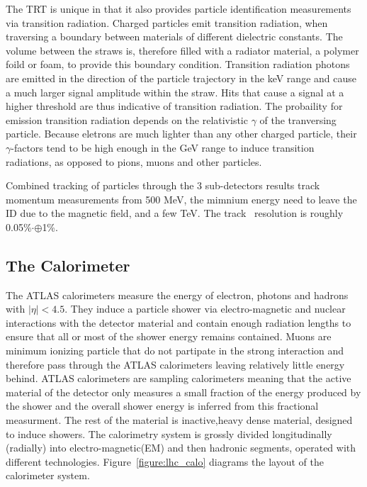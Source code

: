 The TRT is unique in that it also provides particle identification measurements via transition radiation. Charged particles emit transition radiation, when traversing a boundary between materials of different dielectric constants. The volume between the straws is, therefore filled with a radiator material, a polymer foild or foam, to provide this boundary condition. Transition radiation photons are emitted in the direction of the particle trajectory in the keV range and cause a much larger signal amplitude within the straw. Hits that cause a signal at a higher threshold are thus indicative of transition radiation.  The probaility for emission transition radiation depends on the relativistic $\gamma$ of the tranversing particle. Because eletrons are much lighter than any other charged particle, their $\gamma$-factors tend to be high enough in the GeV range to induce transition radiations, as opposed to pions, muons and other particles. 

Combined tracking of particles through the 3 sub-detectors results track momentum measurements from 500 MeV, the mimnium energy need to leave the ID due to the magnetic field, and a few TeV. The track \pt\ resolution is roughly 0.05\%$\cdot$\pt$\oplus$1\%.  

\subsection{The Calorimeter}

The ATLAS calorimeters measure the energy of electron, photons and hadrons with $|\eta|<4.5$. They induce a particle shower via electro-magnetic and nuclear interactions with the detector material and contain enough radiation lengths to ensure that all or most of the shower energy remains contained. Muons are minimum ionizing particle that do not partipate in the strong interaction and therefore pass through the ATLAS calorimeters leaving relatively little energy behind. ATLAS calorimeters are sampling calorimeters meaning that the active material of the detector only measures a small fraction of the energy produced by the shower and the overall shower energy is inferred from this fractional measurment. The rest of the material is inactive,heavy dense material, designed to induce showers. The calorimetry system is grossly divided longitudinally (radially) into electro-magnetic(EM) and then hadronic segments, operated with different technologies. Figure~\ref{figure:lhc_calo} diagrams the layout of the calorimeter system.

